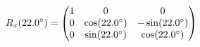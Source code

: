 \documentclass[preview]{standalone}
\begin{document}
\begin{align*}
\special{dvisvgm:raw <g id='unique000'>}R_x(22.0^\circ) = \begin{pmatrix} 1 & 0 & 0 \\ 0 & \cos(22.0^\circ) & -\sin(22.0^\circ) \\ 0 & \sin(22.0^\circ) & \cos(22.0^\circ) \end{pmatrix}\special{dvisvgm:raw </g>}
\end{align*}
\end{document}
